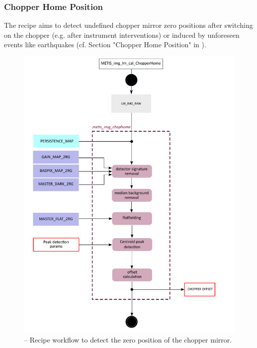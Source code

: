 \subsubsection{Chopper Home Position}\label{ssec:metisimgchophome}
The recipe  aims to detect undefined chopper mirror zero positions after switching on the chopper (e.g. after instrument interventions) or induced by unforeseen events like earthquakes (cf. Section "Chopper Home Position" in  \cite{METIS-calibration_plan}).
\begin{figure}[ht]
  \centering
  \includegraphics[width=0.5\textheight]{figures/metis_img_chophome_v0.1.pdf}
  \caption[Recipe: ]{ --
    Recipe workflow to detect the zero position of the chopper mirror.}
  \label{Fig:rec_chop_home}
\end{figure}

